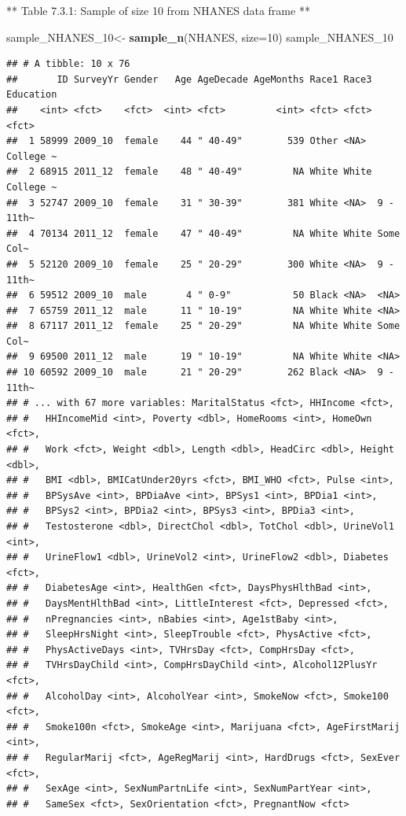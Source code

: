 \documentclass[]{book}
\newenvironment{Shaded}{\begin{snugshade}}{\end{snugshade}}
\newcommand{\DataTypeTok}[1]{\textcolor[rgb]{0.13,0.29,0.53}{#1}}
\newcommand{\DecValTok}[1]{\textcolor[rgb]{0.00,0.00,0.81}{#1}}
\newcommand{\KeywordTok}[1]{\textcolor[rgb]{0.13,0.29,0.53}{\textbf{#1}}}
\newcommand{\NormalTok}[1]{#1}
\newcommand{\StringTok}[1]{\textcolor[rgb]{0.31,0.60,0.02}{#1}}
\begin{document}
** Table 7.3.1: Sample of size 10 from NHANES data frame **

\begin{Shaded}
\begin{Highlighting}[]
\NormalTok{sample_NHANES_}\DecValTok{10}\NormalTok{<-}
\StringTok{  }\KeywordTok{sample_n}\NormalTok{(NHANES, }\DataTypeTok{size=}\DecValTok{10}\NormalTok{)}
\NormalTok{sample_NHANES_}\DecValTok{10}
\end{Highlighting}
\end{Shaded}

\begin{verbatim}
## # A tibble: 10 x 76
##       ID SurveyYr Gender   Age AgeDecade AgeMonths Race1 Race3 Education
##    <int> <fct>    <fct>  <int> <fct>         <int> <fct> <fct> <fct>    
##  1 58999 2009_10  female    44 " 40-49"        539 Other <NA>  College ~
##  2 68915 2011_12  female    48 " 40-49"         NA White White College ~
##  3 52747 2009_10  female    31 " 30-39"        381 White <NA>  9 - 11th~
##  4 70134 2011_12  female    47 " 40-49"         NA White White Some Col~
##  5 52120 2009_10  female    25 " 20-29"        300 White <NA>  9 - 11th~
##  6 59512 2009_10  male       4 " 0-9"           50 Black <NA>  <NA>     
##  7 65759 2011_12  male      11 " 10-19"         NA White White <NA>     
##  8 67117 2011_12  female    25 " 20-29"         NA White White Some Col~
##  9 69500 2011_12  male      19 " 10-19"         NA White White <NA>     
## 10 60592 2009_10  male      21 " 20-29"        262 Black <NA>  9 - 11th~
## # ... with 67 more variables: MaritalStatus <fct>, HHIncome <fct>,
## #   HHIncomeMid <int>, Poverty <dbl>, HomeRooms <int>, HomeOwn <fct>,
## #   Work <fct>, Weight <dbl>, Length <dbl>, HeadCirc <dbl>, Height <dbl>,
## #   BMI <dbl>, BMICatUnder20yrs <fct>, BMI_WHO <fct>, Pulse <int>,
## #   BPSysAve <int>, BPDiaAve <int>, BPSys1 <int>, BPDia1 <int>,
## #   BPSys2 <int>, BPDia2 <int>, BPSys3 <int>, BPDia3 <int>,
## #   Testosterone <dbl>, DirectChol <dbl>, TotChol <dbl>, UrineVol1 <int>,
## #   UrineFlow1 <dbl>, UrineVol2 <int>, UrineFlow2 <dbl>, Diabetes <fct>,
## #   DiabetesAge <int>, HealthGen <fct>, DaysPhysHlthBad <int>,
## #   DaysMentHlthBad <int>, LittleInterest <fct>, Depressed <fct>,
## #   nPregnancies <int>, nBabies <int>, Age1stBaby <int>,
## #   SleepHrsNight <int>, SleepTrouble <fct>, PhysActive <fct>,
## #   PhysActiveDays <int>, TVHrsDay <fct>, CompHrsDay <fct>,
## #   TVHrsDayChild <int>, CompHrsDayChild <int>, Alcohol12PlusYr <fct>,
## #   AlcoholDay <int>, AlcoholYear <int>, SmokeNow <fct>, Smoke100 <fct>,
## #   Smoke100n <fct>, SmokeAge <int>, Marijuana <fct>, AgeFirstMarij <int>,
## #   RegularMarij <fct>, AgeRegMarij <int>, HardDrugs <fct>, SexEver <fct>,
## #   SexAge <int>, SexNumPartnLife <int>, SexNumPartYear <int>,
## #   SameSex <fct>, SexOrientation <fct>, PregnantNow <fct>
\end{verbatim}
\end{document}
